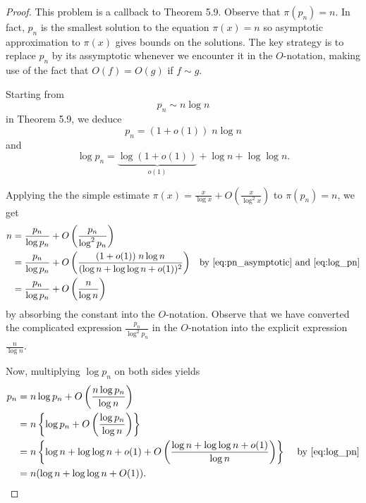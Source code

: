 \documentclass[12pt]{article}
\renewcommand{\O}[1]{O\left( #1 \right)}
\begin{document}
\begin{proof}
This problem is a callback to Theorem 5.9. Observe that $\pi(p_n) = n$. In fact, $p_n$ is the smallest solution to the equation $\pi(x) = n$ so asymptotic approximation to $\pi(x)$ gives bounds on the solutions. The key strategy is to replace $p_n$ by its assymptotic whenever we encounter it in the $O$-notation, making use of the fact that $O(f) = O(g)$ if $f \sim g$.

Starting from
$$p_n \sim n \log n$$
in Theorem 5.9, we deduce
\begin{equation}
p_n = (1 + o(1)) \; n \log n
\label{eq:pn_asymptotic}
\end{equation}
and
\begin{equation}
\log p_n = \underbrace{\log (1 + o(1))}_{o(1)} + \log n + \log \log n.
\label{eq:log_pn}
\end{equation}

Applying the the simple estimate $\pi(x) = \frac{x}{\log x} + \O{\frac{x}{\log^2 x}}$ to $\pi(p_n) = n$, we get
\begin{align*}
n &= \frac{p_n}{\log p_n} + \O{\frac{p_n}{\log^2 p_n}}\\
&= \frac{p_n}{\log p_n} + \O{\frac{(1 + o(1)) \; n \log n}{(\log n + \log \log n + o(1))^2}} &\text{by } \eqref{eq:pn_asymptotic} \text{ and } \eqref{eq:log_pn}\\
&= \frac{p_n}{\log p_n} + \O{\frac{n}{\log n}}
\end{align*}
by absorbing the constant into the $O$-notation. Observe that we have converted the complicated expression $\frac{p_n}{\log^2 p_n}$ in the $O$-notation into the explicit expression $\frac{n}{\log n}$.

Now, multiplying $\log p_n$ on both sides yields
\begin{align*}
p_n &= n \log p_n + \O{\frac{n \log p_n}{\log n}} \\
&= n \left\{ \log p_n + \O{\frac{\log p_n}{\log n}} \right\} \\
&= n \left\{ \log n + \log \log n + o(1) + \O{\frac{ \log n + \log \log n + o(1)}{\log n}} \right\} &\text{ by }\eqref{eq:log_pn}\\
&= n(\log n + \log \log n + O(1)).
\end{align*}
\end{proof}

\unless\ifdefined\IsMainDocument
\end{document}

